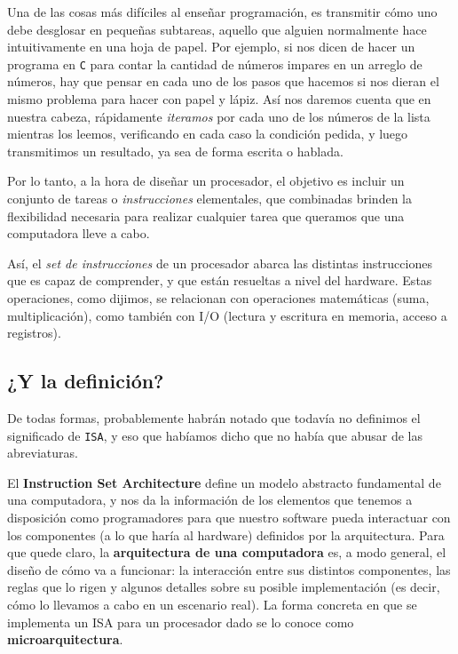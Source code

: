\documentclass[a4paper, titlepage]{report}
\begin{document}
	Una de las cosas más difíciles al enseñar programación, es transmitir cómo uno debe desglosar en pequeñas subtareas, aquello que alguien normalmente hace intuitivamente en una hoja de papel. Por ejemplo, si nos dicen de hacer un programa en \texttt{C} para contar la cantidad de números impares en un arreglo de números, hay que pensar en cada uno de los pasos que hacemos si nos dieran el mismo problema para hacer con papel y lápiz. Así nos daremos cuenta que en nuestra cabeza, rápidamente \textit{iteramos} por cada uno de los números de la lista mientras los leemos, verificando en cada caso la condición pedida, y luego transmitimos un resultado, ya sea de forma escrita o hablada.
	
	Por lo tanto, a la hora de diseñar un procesador, el objetivo es incluir un conjunto de tareas o \textit{instrucciones} elementales, que combinadas brinden la flexibilidad necesaria para realizar cualquier tarea que queramos que una computadora lleve a cabo.
	
	Así, el \textit{set de instrucciones} de un procesador abarca las distintas instrucciones que es capaz de comprender, y que están resueltas a nivel del hardware. Estas operaciones, como dijimos, se relacionan con operaciones matemáticas (suma, multiplicación), como también con I/O (lectura y escritura en memoria, acceso a registros).
	
	\subsection{¿Y la definición?}
	
	De todas formas, probablemente habrán notado que todavía no definimos el significado de \texttt{ISA}, y eso que habíamos dicho que no había que abusar de las abreviaturas.
	
	El \textbf{Instruction Set Architecture} define un modelo abstracto fundamental de una computadora, y nos da la información de los elementos que tenemos a disposición como programadores para que nuestro software pueda interactuar con los componentes (a lo que haría al hardware) definidos por la arquitectura. Para que quede claro, la \textbf{arquitectura de una computadora} es, a modo general, el diseño de cómo va a funcionar: la interacción entre sus distintos componentes, las reglas que lo rigen y algunos detalles sobre su posible implementación (es decir, cómo lo llevamos a cabo en un escenario real). La forma concreta en que se implementa un ISA para un procesador dado se lo conoce como \textbf{microarquitectura}.
	
\end{document}
